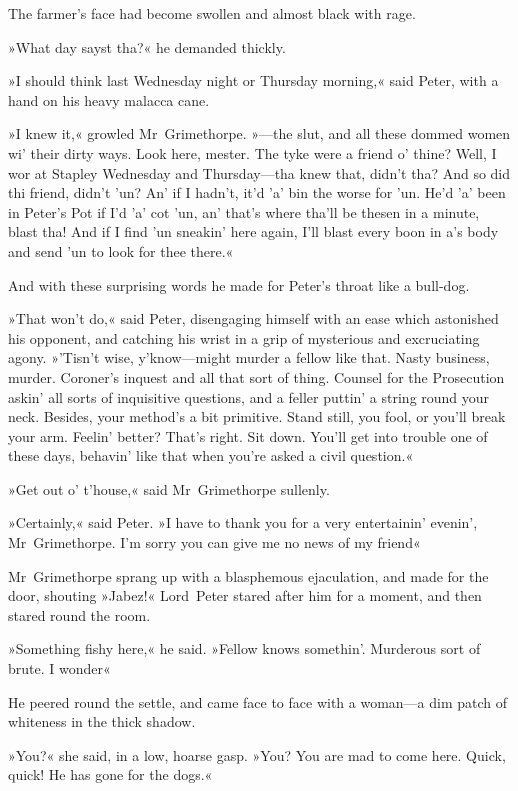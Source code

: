 The farmer's face had become swollen and almost black with rage.

»What day sayst tha?« he demanded thickly.

»I should think last Wednesday night or Thursday morning,« said Peter, with a hand on his heavy malacca cane.

»I knew it,« growled Mr~Grimethorpe. »—the slut, and all these dommed women wi' their dirty ways. Look here, mester. The tyke were a friend o' thine? Well, I wor at Stapley Wednesday and Thursday—tha knew that, didn't tha? And so did thi friend, didn't 'un? An' if I hadn't, it'd 'a' bin the worse for 'un. He'd 'a' been in Peter's Pot if I'd 'a' cot 'un, an' that's where tha'll be thesen in a minute, blast tha! And if I find 'un sneakin' here again, I'll blast every boon in a's body and send 'un to look for thee there.«

And with these surprising words he made for Peter's throat like a bull-dog.

»That won't do,« said Peter, disengaging himself with an ease which astonished his opponent, and catching his wrist in a grip of mysterious and excruciating agony. »'Tisn't wise, y'know—might murder a fellow like that. Nasty business, murder. Coroner's inquest and all that sort of thing. Counsel for the Prosecution askin' all sorts of inquisitive questions, and a feller puttin' a string round your neck. Besides, your method's a bit primitive. Stand still, you fool, or you'll break your arm. Feelin' better? That's right. Sit down. You'll get into trouble one of these days, behavin' like that when you're asked a civil question.«

»Get out o' t'house,« said Mr~Grimethorpe sullenly.

»Certainly,« said Peter. »I have to thank you for a very entertainin' evenin', Mr~Grimethorpe. I'm sorry you can give me no news of my friend\longdash«

Mr~Grimethorpe sprang up with a blasphemous ejaculation, and made for the door, shouting »Jabez!« Lord~Peter stared after him for a moment, and then stared round the room.

»Something fishy here,« he said. »Fellow knows somethin'. Murderous sort of brute. I wonder\longdash«

He peered round the settle, and came face to face with a woman—a dim patch of whiteness in the thick shadow.

»You?« she said, in a low, hoarse gasp. »You? You are mad to come here.  Quick, quick! He has gone for the dogs.«

